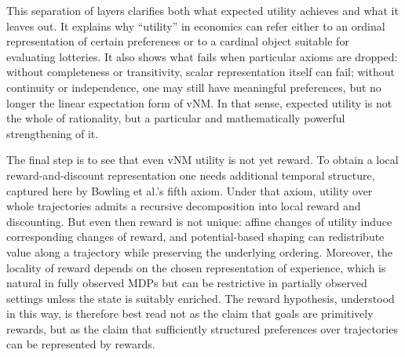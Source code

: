 \documentclass[11pt]{article}
\begin{document}
This separation of layers clarifies both what expected utility achieves and
what it leaves out. It explains why ``utility'' in economics can refer either
to an ordinal representation of certain preferences or to a cardinal object
suitable for evaluating lotteries. It also shows what fails when particular
axioms are dropped: without completeness or transitivity, scalar representation
itself can fail; without continuity or independence, one may still have
meaningful preferences, but no longer the linear expectation form of vNM. In
that sense, expected utility is not the whole of rationality, but a particular
and mathematically powerful strengthening of it.

The final step is to see that even vNM utility is not yet reward. To obtain a
local reward-and-discount representation one needs additional temporal
structure, captured here by Bowling et al.'s fifth axiom. Under that axiom,
utility over whole trajectories admits a recursive decomposition into local
reward and discounting. But even then reward is not unique: affine changes of
utility induce corresponding changes of reward, and potential-based shaping can
redistribute value along a trajectory while preserving the underlying ordering.
Moreover, the locality of reward depends on the chosen representation of
experience, which is natural in fully observed MDPs but can be restrictive in
partially observed settings unless the state is suitably enriched. The reward
hypothesis, understood in this way, is therefore best read not as the claim
that goals are primitively rewards, but as the claim that sufficiently
structured preferences over trajectories can be represented by rewards.





%
\end{document}
